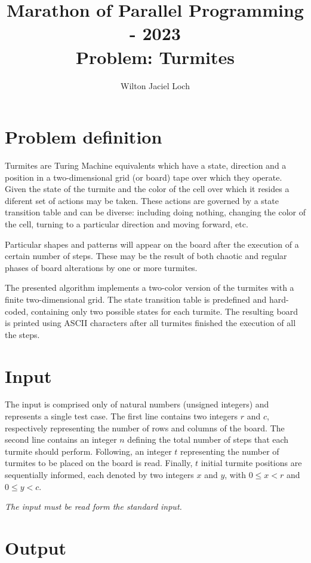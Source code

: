 \documentclass{article}
\title{Marathon of Parallel Programming - 2023\\ Problem: Turmites}
\author{Wilton Jaciel Loch}
\begin{document}
\maketitle

\section*{Problem definition}

Turmites are Turing Machine equivalents which have a state, direction and a
position in a two-dimensional grid (or board) tape over which they operate.
%
Given the state of the turmite and the color of the cell over which it resides
a diferent set of actions may be taken.
%
These actions are governed by a state transition table and can be diverse:
including doing nothing, changing the color of the cell, turning to a
particular direction and moving forward, etc.

Particular shapes and patterns will appear on the board after the execution of a
certain number of steps. These may be the result of both chaotic and regular
phases of board alterations by one or more turmites.

The presented algorithm implements a two-color version of the turmites with a
finite two-dimensional grid.
%
The state transition table is predefined and hard-coded, containing only two
possible states for each turmite.
%
The resulting board is printed using ASCII characters after all turmites
finished the execution of all the steps.

\section*{Input}

The input is comprised only of natural numbers (unsigned integers) and represents a single test case.
%
The first line contains two integers $r$ and $c$, respectively representing the number of rows and columns of the board.
%
The second line contains an integer $n$ defining the total number of steps that each turmite should perform.
%
Following, an integer $t$ representing the number of turmites to be placed on the board is read.
%
Finally, $t$ initial turmite positions are sequentially informed, each denoted by two
integers $x$ and $y$, with $0 \leq x < r$ and $0 \leq y < c$.
%

\textit{The input must be read form the standard input.}

\section*{Output}
\end{document}
